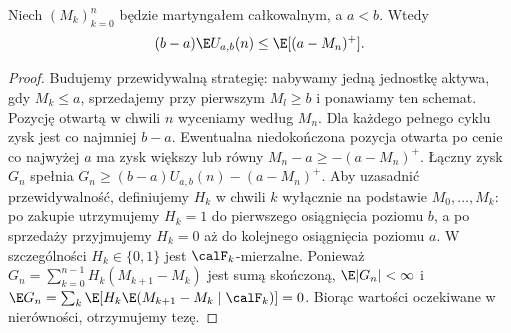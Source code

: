 \begin{lemat}
Niech $(M_k)_{k=0}^n$ będzie martyngałem całkowalnym,
a $a<b$. Wtedy
\[
(b-a)\E U_{a,b}(n)\le\E[(a-M_n)^+].
\]
\end{lemat}
\begin{proof}
Budujemy przewidywalną strategię: nabywamy jedną jednostkę
aktywa, gdy $M_k\le a$, sprzedajemy przy pierwszym
$M_l\ge b$ i ponawiamy ten schemat. Pozycję otwartą
w chwili $n$ wyceniamy według $M_n$.
Dla każdego pełnego cyklu zysk jest co najmniej $b-a$.
Ewentualna niedokończona pozycja otwarta po cenie
co najwyżej $a$ ma zysk większy lub równy
$M_n-a\ge-(a-M_n)^+$. Łączny zysk $G_n$ spełnia
$G_n\ge(b-a)U_{a,b}(n)-(a-M_n)^+$.
Aby uzasadnić przewidywalność, definiujemy $H_k$ w chwili $k$
wyłącznie na podstawie $M_0,\ldots,M_k$: po zakupie utrzymujemy
$H_k=1$ do pierwszego osiągnięcia poziomu $b$, a po sprzedaży
przyjmujemy $H_k=0$ aż do kolejnego osiągnięcia poziomu $a$.
W szczególności $H_k\in\{0,1\}$ jest $\calF_k$-mierzalne.
Ponieważ
$G_n=\sum_{k=0}^{n-1}H_k(M_{k+1}-M_k)$ jest sumą skończoną,
$\E|G_n|<\infty$ i
$\E G_n=\sum_k\E[H_k\E(M_{k+1}-M_k\mid\calF_k)]=0$. Biorąc wartości
oczekiwane w nierówności, otrzymujemy tezę.
\end{proof}


